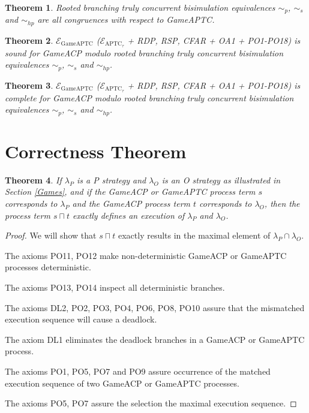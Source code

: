 \documentclass{fac}
\newtheorem{theorem}{Theorem}[section]
\begin{document}
\begin{theorem}
Rooted branching truly concurrent bisimulation equivalences $\sim_p$, $\sim_s$ and $\sim_{hp}$ are all congruences with respect to GameAPTC.
\end{theorem}

\begin{theorem}
$\mathcal{E}_{\textrm{GameAPTC}}$ ($\mathcal{E}_{\textrm{APTC}_\tau}$ + RDP, RSP, CFAR + OA1 + PO1-PO18) is sound for GameACP modulo rooted branching truly concurrent bisimulation equivalences $\sim_p$, $\sim_s$ and $\sim_{hp}$.
\end{theorem}

\begin{theorem}
$\mathcal{E}_{\textrm{GameAPTC}}$ ($\mathcal{E}_{\textrm{APTC}_\tau}$ + RDP, RSP, CFAR + OA1 + PO1-PO18) is complete for GameACP modulo rooted branching truly concurrent bisimulation equivalences $\sim_p$, $\sim_s$ and $\sim_{hp}$.
\end{theorem}

\section{Correctness Theorem}

\begin{theorem}
If $\lambda_P$ is a P strategy and $\lambda_O$ is an O strategy as illustrated in Section \ref{Games}, and if the GameACP or GameAPTC process term $s$ corresponds to $\lambda_P$ and the GameACP process term $t$ corresponds to $\lambda_O$, then the process term $s \sqcap t$ exactly defines an execution of $\lambda_P$ and $\lambda_O$.
\end{theorem}

\begin{proof}
We will show that $s\sqcap t$ exactly results in the maximal element of $\lambda_P \cap \lambda_O$.

The axioms PO11, PO12 make non-deterministic GameACP or GameAPTC processes deterministic.

The axioms PO13, PO14 inspect all deterministic branches.

The axioms DL2, PO2, PO3, PO4, PO6, PO8, PO10 assure that the mismatched execution sequence will cause a deadlock.

The axiom DL1 eliminates the deadlock branches in a GameACP or GameAPTC process.

The axioms PO1, PO5, PO7 and PO9 assure occurrence of the matched execution sequence of two GameACP or GameAPTC processes.

The axioms PO5, PO7 assure the selection the maximal execution sequence.
\end{proof}
\end{document}
